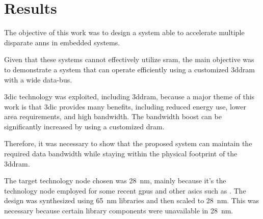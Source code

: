 
\chapter{Results}
\label{sec:Results}
The objective of this work was to design a system able to accelerate multiple disparate \acp{ann} in embedded systems.
\iffalse
This means systems that are not designed to process multiple requests of essentially the same operation.
\fi
Given that these systems cannot effectively utilize \ac{sram}, the main objective was to demonstrate a system that can operate efficiently using a customized \ac{3ddram} with a wide data-bus.
\iffalse
The implemented system decodes instructions, sends configuration to various functions, pre-fetches and pipelines data.
This parallelism allows the system to constantly stream data while results from previous operations are being processed.
\fi

\ac{3dic} technology was exploited, including \ac{3ddram}, because a major theme of this work is that \ac{3dic} provides many benefits, including reduced energy use, lower area requirements, and high bandwidth. 
The bandwidth boost can be significantly increased by using a customized \ac{dram}.
\iffalse
To demonstrate such a system, this work targeted \ac{3dic} technology including \ac{3ddram}. This work proposes that if a system can be purely in \ac{3dic}, the system can take advantage of the benefits
of \ac{3dic} which includes reduced energy, area and high bandwidth.
In addition, this work proposes that given the system is \ac{3dic}, then a customized \ac{dram} would provide a significant bandwidth boost over typical implementations using standard DRAM.
\fi
\iffalse
To maintain a purely \ac{3dic} architecture, the area of the system Manager and Processing Engine had to stay within the physical footprint of the \ac{3ddram}.
\fi
Therefore, it was necessary to show that the proposed system can maintain the required data bandwidth while staying within the physical footprint of the \ac{3ddram}. 


The target technology node chosen was \SI{28}{\nano\meter}, mainly because it's the technology node employed for some recent \acp{gpu} and other \acp{asic} such as \cite{jouppi2017datacenter}.
The design was synthesized using \SI{65}{\nano\meter} libraries and then scaled to \SI{28}{\nano\meter}.  This was necessary because certain library components were unavailable
in \SI{28}{\nano\meter}.

